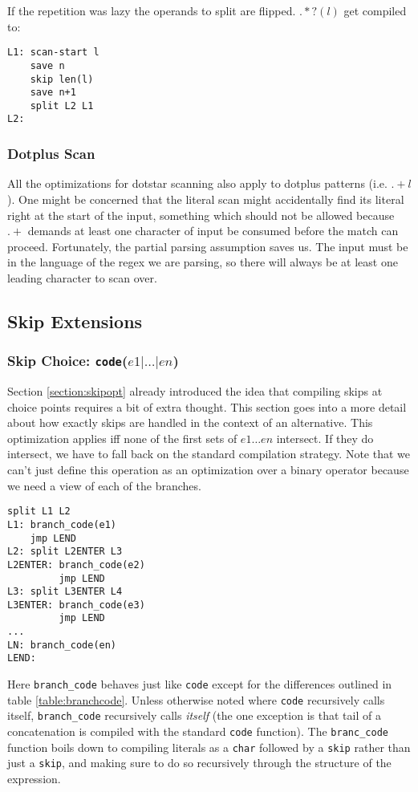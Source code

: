 If the repetition was lazy the operands to split are flipped.
$.*?(l)$ get compiled to:

\begin{verbatim}
L1: scan-start l
    save n
    skip len(l)
    save n+1
    split L2 L1
L2: 
\end{verbatim}

\subsubsection{Dotplus Scan}

All the optimizations for dotstar scanning also apply to dotplus
patterns (i.e. $.+l$). One might be concerned that the literal scan
might accidentally find its literal right at the start of the input,
something which should not be allowed because $.+$ demands at least
one character of input be consumed before the match can proceed.
Fortunately, the partial parsing assumption saves us. The input must
be in the language of the regex we are parsing, so there will always
be at least one leading character to scan over.

\subsection{Skip Extensions}

\subsubsection{Skip Choice: {\tt code}($e1 \rvert \dots \rvert en$)}

Section \ref{section:skipopt} already introduced the idea that
compiling skips at choice points requires a bit of extra thought.
This section goes into a more detail about how exactly skips are
handled in the context of an alternative.
This optimization applies iff none of the first sets of $e1 \dots en$
intersect. If they do intersect, we have to fall back on the standard
compilation strategy. Note that we can't just define this operation as
an optimization over a binary operator because we need a view of each
of the branches.

\begin{verbatim}
split L1 L2
L1: branch_code(e1)
    jmp LEND
L2: split L2ENTER L3
L2ENTER: branch_code(e2)
         jmp LEND
L3: split L3ENTER L4
L3ENTER: branch_code(e3)
         jmp LEND
...
LN: branch_code(en)
LEND:
\end{verbatim}

Here \verb'branch_code' behaves just like \verb'code' except 
for the differences outlined in table \ref{table:branchcode}.
Unless otherwise noted where \verb'code' recursively calls
itself, \verb'branch_code' recursively calls \emph{itself}
(the one exception is that tail of a concatenation is
compiled with the standard \verb'code' function).
The \verb'branc_code' function boils down to compiling literals
as a \verb'char' followed by a \verb'skip' rather than just
a \verb'skip', and making sure to do so recursively through
the structure of the expression.

